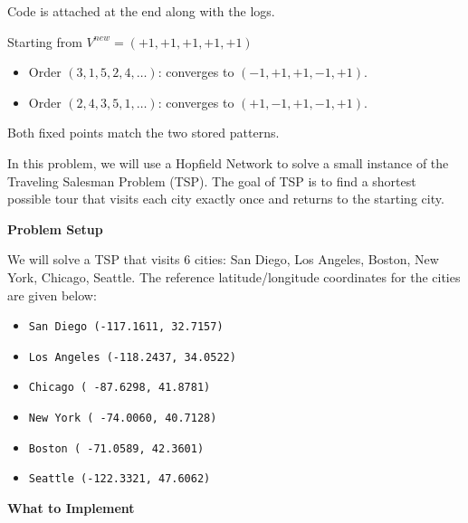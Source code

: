 \documentclass{article}
\begin{document}
\begin{probset}
\begin{prob}
    \begin{soln}
        Code is attached at the end along with the logs.

        Starting from $V^{new} = (+1, +1, +1, +1, +1)$
        \begin{itemize}
            \item Order $(3, 1, 5, 2, 4, \ldots)$: converges to $(-1, +1, +1, -1, +1)$.
            \item Order $(2, 4, 3, 5, 1, \ldots)$: converges to $(+1, -1, +1, -1, +1)$.
        \end{itemize}
        Both fixed points match the two stored patterns.
    \end{soln}
\end{prob}

\newpage

\begin{prob}
    In this problem, we will use a Hopfield Network to solve a small instance of the Traveling Salesman Problem (TSP). The goal of TSP is to find a shortest possible tour that visits each city exactly once and returns to the starting city.

    \textbf{Problem Setup}

    We will solve a TSP that visits 6 cities: San Diego, Los Angeles, Boston, New York, Chicago, Seattle. The reference latitude/longitude coordinates for the cities are given below:
    \begin{itemize}
        \item \texttt{San Diego (-117.1611, 32.7157)}
        \item \texttt{Los Angeles (-118.2437, 34.0522)}
        \item \texttt{Chicago ( -87.6298, 41.8781)}
        \item \texttt{New York ( -74.0060, 40.7128)}
        \item \texttt{Boston ( -71.0589, 42.3601)}
        \item \texttt{Seattle (-122.3321, 47.6062)}
    \end{itemize}

    \textbf{What to Implement}


\end{prob}
\end{probset}
\end{document}
